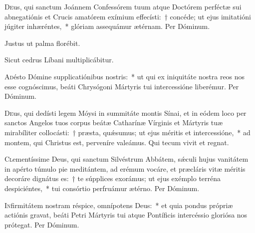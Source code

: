 \documentclass[vesperale_romanum]{subfiles}
\begin{document}

\oratio

\lettrine{D}{e}us, qui sanctum Joánnem Confessórem tuum atque Do\-ctórem perféctæ sui abnegatiónis et Crucis amatórem exímium effecísti:~† concéde; ut ejus imitatióni júgiter inhæréntes,~* glóriam assequámur ætérnam. Per Dóminum.




\vv Justus ut palma florébit.

\rr Sicut cedrus Líbani multiplicábitur.



\lettrine{A}{d}ésto Dómine supplicatiónibus nostris:~* ut qui ex iniquitáte nostra reos nos esse cognóscimus, beáti Chrysógoni Mártyris tui intercessióne liberémur.
Per Dóminum.

\capitdeseq
 
\myrule


\duplex

\oratio

\lettrine{D}{e}us, qui dedísti legem Móysi in summitáte montis Sínai, et in eódem loco per san\-ctos Angelos tuos corpus beátæ Catharínæ Vírginis et Mártyris tuæ mirabíliter collocásti:~† præsta, quǽsumus; ut ejus méritis et intercessióne,~* ad montem, qui Christus est, perveníre valeámus. Qui tecum vivit et regnat.

\myrule


\duplex

\oratio

\lettrine{C}{l}ementíssime Deus, qui sanctum Silvéstrum Abbátem, sǽculi hujus vanitátem in apérto túmulo pie meditántem, ad erémum vocáre, et præcláris vitæ méritis decoráre dignátus es:~† te súpplices exorámus; ut ejus exémplo terréna despiciéntes,~* tui consórtio perfruámur ætérno.
Per Dóminum.



\oratio

\lettrine{I}{n}firmitátem nostram réspice, omnípotens Deus:~* et quia pondus própriæ actiónis gravat, beáti Petri Mártyris tui atque Pontíficis intercéssio gloriósa nos prótegat.
Per Dóminum.
\end{document}
